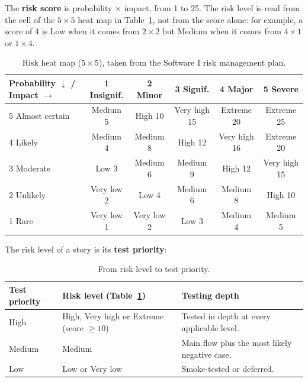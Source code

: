 The \textbf{risk score} is probability $\times$ impact, from 1 to 25. The risk level is read from
the cell of the $5\times5$ heat map in Table~\ref{tab:risk-heatmap}, not from the score alone:
for example, a score of 4 is Low when it comes from $2\times2$ but Medium when it comes from
$4\times1$ or $1\times4$.

\begin{table}[H]
  \centering
  \small
  \begin{tabular}{@{}lccccc@{}}
    \toprule
    Probability $\downarrow$ / Impact $\rightarrow$
      & 1 Insignif. & 2 Minor & 3 Signif. & 4 Major & 5 Severe \\
    \midrule
    5 Almost certain & Medium 5   & High 10    & Very high 15 & Extreme 20   & Extreme 25 \\
    4 Likely         & Medium 4   & Medium 8   & High 12      & Very high 16 & Extreme 20 \\
    3 Moderate       & Low 3      & Medium 6   & Medium 9     & High 12      & Very high 15 \\
    2 Unlikely       & Very low 2 & Low 4      & Medium 6     & Medium 8     & High 10 \\
    1 Rare           & Very low 1 & Very low 2 & Low 3        & Medium 4     & Medium 5 \\
    \bottomrule
  \end{tabular}
  \caption{Risk heat map ($5\times5$), taken from the Software I risk management plan.}
  \label{tab:risk-heatmap}
\end{table}

The risk level of a story is its \textbf{test priority}:

\begin{table}[H]
  \centering
  \begin{tabularx}{\linewidth}{L{2.4cm}L{5.2cm}Y}
    \toprule
    Test priority & Risk level (Table~\ref{tab:risk-heatmap}) & Testing depth \\
    \midrule
    High   & High, Very high or Extreme (score $\geq 10$) & Tested in depth at every applicable level. \\
    Medium & Medium                                        & Main flow plus the most likely negative case. \\
    Low    & Low or Very low                               & Smoke-tested or deferred. \\
    \bottomrule
  \end{tabularx}
  \caption{From risk level to test priority.}
  \label{tab:risk-scale}
\end{table}

